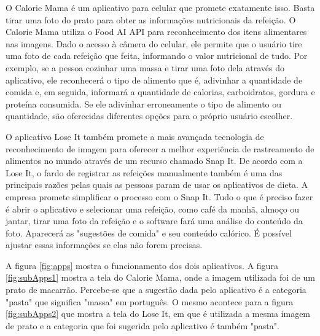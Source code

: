 O Calorie Mama \cite{caloriemama_2016} é um aplicativo para celular que promete exatamente isso. Basta tirar uma foto do prato para obter as informações nutricionais da refeição. O Calorie Mama utiliza o Food AI API para reconhecimento dos itens alimentares nas imagens. Dado o acesso à câmera do celular, ele permite que o usuário tire uma foto de cada refeição que feita, informando o valor nutricional de tudo. Por exemplo, se a pessoa cozinhar uma massa e tirar uma foto dela através do aplicativo, ele reconhecerá o tipo de alimento que é, adivinhar a quantidade de comida e, em seguida, informará a quantidade de calorias, carboidratos, gordura e proteína consumida. Se ele adivinhar erroneamente o tipo de alimento ou quantidade, são oferecidas diferentes opções para o próprio usuário escolher.

O aplicativo Lose It \cite{lose_it} também promete a mais avançada tecnologia de reconhecimento de imagem para oferecer a melhor experiência de rastreamento de alimentos no mundo através de um recurso chamado Snap It.  De acordo com a Lose It, o fardo de registrar as refeições manualmente também é uma das principais razões pelas quais as pessoas param de usar os aplicativos de dieta. A empresa promete simplificar o processo com o Snap It. Tudo o que é preciso fazer é abrir o aplicativo e selecionar uma refeição, como café da manhã, almoço ou jantar, tirar uma foto da refeição e o software fará uma análise do conteúdo da foto. Aparecerá as "sugestões de comida" e seu conteúdo calórico. É possível ajustar essas informações se elas não forem precisas.

A figura \ref{fig:apps} mostra o funcionamento dos dois aplicativos. A figura \ref{fig:subApps1} mostra a tela do Calorie Mama, onde a imagem utilizada foi de um prato de macarrão. Percebe-se que a sugestão dada pelo aplicativo é a categoria "pasta" que significa "massa" em português. O mesmo acontece para a figura \ref{fig:subApps2} que mostra a tela do Lose It, em que é utilizada a mesma imagem de prato e a categoria que foi sugerida pelo aplicativo é também "pasta".

